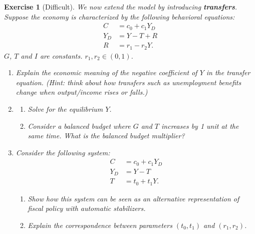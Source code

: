 \documentclass[12pt]{article}
\newtheorem{exercise}{Exercise}
\begin{document}
\begin{exercise}[Difficult]
    We now extend the model by introducing \textbf{transfers}. Suppose the economy is characterized by the following behavioral equations:
    \begin{align*}
        C &= c_0 + c_1 Y_D\\
        Y_D &= Y - T + R\\
        R &= r_1 - r_2 Y.
    \end{align*}
    $G$, $T$ and $I$ are constants. $r_1, r_2 \in (0,1)$.
    \begin{enumerate}[label=(\arabic*)]
        \item Explain the economic meaning of the negative coefficient of $Y$ in the transfer equation. (Hint: think about how transfers such as unemployment benefits change when output/income rises or falls.)
        \item \begin{enumerate}[label=\alph*.]
            \item Solve for the equilibrium $Y$.
            \item Consider a balanced budget where $G$ and $T$ increases by 1 unit at the same time. What is the balanced budget multiplier? 
        \end{enumerate}
        \item Consider the following system:
        \begin{align*}
            C &= c_0 + c_1 Y_D\\
            Y_D &= Y - T\\
            T &= t_0 + t_1 Y.
        \end{align*}
        \begin{enumerate}[label=\alph*.]
            \item Show how this system can be seen as an alternative representation of fiscal policy with automatic stabilizers.
            \item Explain the correspondence between parameters $(t_0, t_1)$ and $(r_1, r_2)$.
        \end{enumerate}
    \end{enumerate}
\end{exercise}
\end{document}
